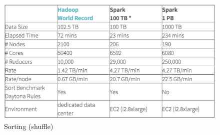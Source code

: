 \documentclass{article}
\begin{document}
\begin{appendices}
\begin{figure}[H]
    \centering
    \includegraphics[scale=0.3]{img/sorting .png}
    \caption{Sorting (shuffle)}
\end{figure}\noindent

\end{appendices}
\end{document}
